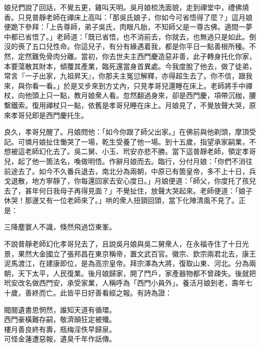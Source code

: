 娘兒們說了回話，不覺五更，雞叫天明。吳月娘梳洗面貌，走到禪堂中，禮佛燒香。只見普靜老師在禪床上高叫：「那吳氏娘子，你如今可省悟得了麼？」這月娘便跪下參拜：「上告尊師，弟子吳氏，肉眼凡胎，不知師父是一尊古佛。適間一夢中都已省悟了。」{}老師道：「既已省悟，也不消前去，你就去，也無過只是如此。倒沒的䘮了五口兒性命。你這兒子，有分有緣遇着我，都是你平日一點善根所種。不然，定然難免骨肉分離。當初，你去世夫主西門慶造惡非善，此子轉身托化你家，本要蕩散其財本，傾覆其產業，臨死還當身首異處。{}今我度脫了他去，做了徒弟，常言『一子出家，九祖昇天』，你那夫主冤愆解釋，亦得超生去了。你不信，跟我來，與你看一看。」於是叉步來到方丈內，只見孝哥兒還睡在床上。老師將手中禪杖，向他頭上只一點，教月娘衆人看。忽然翻過身來，卻是西門慶，項帶沉枷，腰繫鐵索。{}復用禪杖只一點，依舊是孝哥兒睡在床上。月娘見了，不覺放聲大哭，原來孝哥兒即是西門慶托生。{}

良久，孝哥兒醒了。月娘問他：「如今你跟了師父出家。」在佛前與他剃頭，摩頂受記。可憐月娘扯住慟哭了一場，乾生受養了他一場。到十五歲，指望承家嗣業，不想被這老師幻化去了。{}吳二舅、小玉、玳安亦悲不勝。當下這普靜老師，領定孝哥兒，起了他一箇法名，喚做明悟。{}作辭月娘而去。臨行，分付月娘：「你們不消往前途去了。如今不久番兵退去，南北分為兩朝，中原已有箇皇帝，多不上十日，兵戈退散，地方寧靜了，你每還回家去安心度日。」月娘便道：「師父，你度托了孩兒去了，甚年何日我母子再得見面？」不覺扯住，放聲大哭起來。老師便道：「娘子休哭！那邊又有一位老師來了。」哄的衆人扭頸回頭，當下化陣清風不見了。正是：

\begin{myquote}
三降塵寰人不識，倏然飛過岱東峯。
\end{myquote}

不說普靜老師幻化孝哥兒去了，且說吳月娘與吳二舅衆人，在永福寺住了十日光景，果然大金國立了張邦昌在東京稱帝，置文武百官。徽宗、欽宗兩君北去，康王泥馬渡江，在建康即位，是為高宗皇帝。拜宗澤為大將，復取山東、河北。分為兩朝，天下太平，人民復業。後月娘歸家，開了門戶，家產器物都不曾疎失。後就把玳安改名做西門安，承受家業，人稱呼為「西門小員外」。{}養活月娘到老，壽年七十歲，善終而亡。此皆平日好善看經之報。有詩為證：

\begin{myquote}
閥閱遺書思惘然，誰知天道有循環。\\西門豪橫難存嗣，敬濟顛狂定被殲。\\樓月善良終有壽，瓶梅淫佚早歸泉。\\可怪金蓮遭惡報，遺臭千年作話傳。
\end{myquote}

